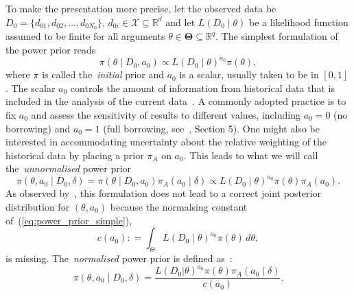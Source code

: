 \documentclass[a4paper, notitlepage, 11pt]{article}
\begin{document}
To make the presentation more precise, let the observed data be $D_0 = \{d_{01}, d_{02}, \ldots, d_{0N_0} \}$, $d_{0i} \in \mathcal{X} \subseteq \mathbb{R}^d$ and let $L(D_0 \mid \theta)$ be a likelihood function assumed to be finite for all arguments $\theta \in \boldsymbol\Theta \subseteq \mathbb{R}^q$. 
The simplest formulation of the power prior reads
\begin{equation}
 \label{eq:power_prior_simple}
 \pi(\theta \mid D_0, a_0) \propto L(D_0 \mid \theta)^{a_0}\pi(\theta),
\end{equation}
where  $\pi$ is called the~\textit{initial} prior and $a_0$ is a scalar, usually taken to be in $[0, 1]$.
The scalar $a_0$ controls the amount of information from historical data that is included in the analysis of the current data~\citep{Ibrahim2000}.
A commonly adopted practice is to fix $a_0$ and assess the sensitivity of results to different values, including $a_0 = 0$ (no borrowing) and $a_0 = 1$ (full borrowing, see~\cite{Ibrahim2015}, Section 5).
One might also be interested in accommodating uncertainty about the relative weighting of the historical data by placing a prior $\pi_A$ on $a_0$.
This leads to what we will call the~\textit{unnormalised} power prior
\begin{equation}
 \label{eq:unnormalised_power_prior}
 \pi(\theta, a_0 \mid D_0, \delta) = \pi(\theta \mid D_0, a_0)\pi_A(a_0 \mid \delta) \propto L(D_0 \mid \theta)^{a_0}\pi(\theta)\pi_A(a_0).
\end{equation}
As observed by~\cite{Neuenschwander2009}, this formulation does not lead to a correct joint posterior distribution for $(\theta, a_0)$ because the normalsing constant of~(\ref{eq:power_prior_simple}),
\begin{equation}
 \label{eq:normalising_constant}
 c(a_0) : = \int_{\Theta} L( D_0 \mid \theta)^{a_0}\pi(\theta) \, d\theta,
\end{equation}
is missing.
The~\textit{normalised} power prior is defined as~\citep{Duan2006a,Duan2006b}:
\begin{equation}
 \label{eq:normalised_power_prior}
  \pi(\theta, a_0 \mid D_0, \delta) = \frac{L(D_0| \theta)^{a_0} \pi(\theta)  \pi_A(a_0\mid \delta)}{c(a_0)}.
\end{equation}
\end{document}
